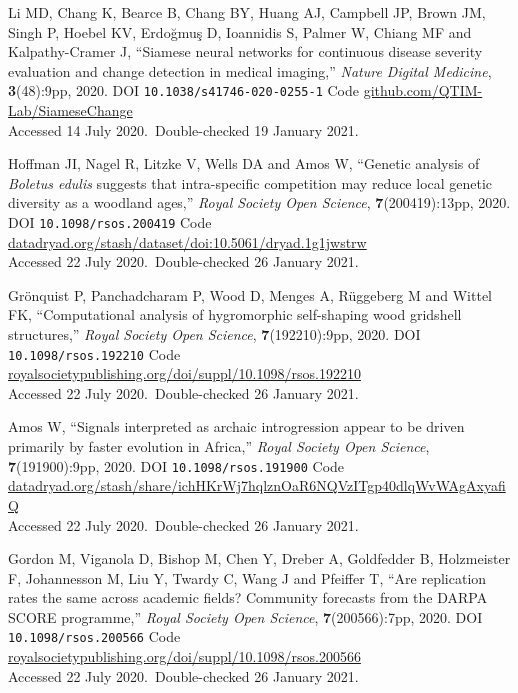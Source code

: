 \vbox{
Li MD,  Chang K,  Bearce B,  Chang BY,  Huang AJ,  Campbell JP,  Brown JM,  Singh P,  Hoebel KV,   Erdo{\u g}mu\c{s} D,  Ioannidis S,  Palmer W,  Chiang MF and  Kalpathy-Cramer J, ``Siamese neural networks for continuous disease severity evaluation and change detection in medical imaging,'' \emph{Nature Digital Medicine}, \textbf{3}(48):9pp, 2020. DOI \texttt{10.1038/s41746-020-0255-1} {Code \url{github.com/QTIM-Lab/SiameseChange}}\\\hfill{Accessed 14 July 2020.}\ {Double-checked 19 January 2021}.}\bibskip

\vbox{
Hoffman JI,  Nagel R,  Litzke V,  Wells DA and  Amos W, ``Genetic analysis of \emph{Boletus edulis\/} suggests that intra-specific competition may reduce local genetic diversity as a woodland ages,'' \emph{Royal Society Open Science}, \textbf{7}(200419):13pp, 2020. DOI \texttt{10.1098/rsos.200419} {Code \url{datadryad.org/stash/dataset/doi:10.5061/dryad.1g1jwstrw}}\\\hfill{Accessed 22 July 2020.}\ {Double-checked 26 January 2021}.}\bibskip

\vbox{
Gr\"onquist P,  Panchadcharam P,  Wood D,  Menges A,  R\"uggeberg M and  Wittel FK, ``Computational analysis of hygromorphic self-shaping wood gridshell structures,'' \emph{Royal Society Open Science}, \textbf{7}(192210):9pp, 2020. DOI \texttt{10.1098/rsos.192210} {Code \url{royalsocietypublishing.org/doi/suppl/10.1098/rsos.192210}}\\\hfill{Accessed 22 July 2020.}\ {Double-checked 26 January 2021}.}\bibskip

\vbox{
Amos W, ``Signals interpreted as archaic introgression appear to be driven primarily by faster evolution in Africa,'' \emph{Royal Society Open Science}, \textbf{7}(191900):9pp, 2020. DOI \texttt{10.1098/rsos.191900} {Code \url{datadryad.org/stash/share/ichHKrWj7hqlznOaR6NQVzITgp40dlqWvWAgAxyafiQ}}\\\hfill{Accessed 22 July 2020.}\ {Double-checked 26 January 2021}.}\bibskip

\vbox{
Gordon M,  Viganola D,  Bishop M,  Chen Y,  Dreber A,  Goldfedder B,  Holzmeister F,  Johannesson M,  Liu Y,  Twardy C,  Wang J and  Pfeiffer T, ``Are replication rates the same across academic fields? Community forecasts from the DARPA SCORE programme,'' \emph{Royal Society Open Science}, \textbf{7}(200566):7pp, 2020. DOI \texttt{10.1098/rsos.200566} {Code \url{royalsocietypublishing.org/doi/suppl/10.1098/rsos.200566}}\\\hfill{Accessed 22 July 2020.}\ {Double-checked 26 January 2021}.}\bibskip

